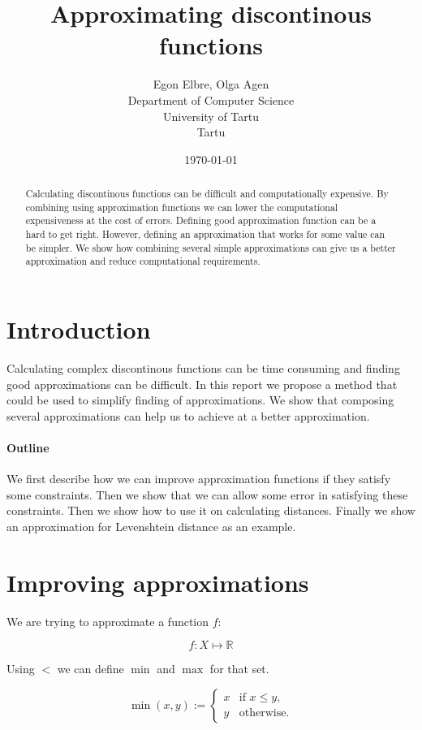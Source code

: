 \documentclass [12pt, a4]{article} %
\title{Approximating discontinous functions}
\author{
    Egon Elbre, Olga Agen \\
        Department of Computer Science \\
    University of Tartu\\
    Tartu\\
}
\date{\today}
\begin{document}
\maketitle

\begin{abstract}
Calculating discontinous functions can be difficult and computationally
expensive. By combining using approximation functions we can lower 
the computational expensiveness at the cost of errors.
Defining good approximation function can be a hard to get right. 
However, defining an approximation that works for some value can 
be simpler. We show how combining several simple approximations 
can give us a better approximation and reduce computational requirements.
\end{abstract}

\section{Introduction}

Calculating complex discontinous functions can be time consuming and finding good approximations can be difficult. In this report we propose a method that could be used to simplify finding of approximations. We show that composing several approximations can help us to achieve at a better approximation.


\paragraph{Outline}

We first describe how we can improve approximation functions if they 
satisfy some constraints. Then we show that we can allow some error
in satisfying these constraints. Then we show how to use it on 
calculating distances. Finally we show an approximation for
Levenshtein distance as an example.

\section{Improving approximations}

\newcommand{\Real}{\mathbb{R}}
\newcommand{\defas}{ := }
\newcommand{\err}[1]{\varepsilon_{#1}}

We are trying to approximate a function $f$:

$$f : X \mapsto \Real$$

Using $<$ we can define $\min$ and $\max$ for that set.

$$ \min(x,y) \defas \begin{cases}
    x & \text{if $x \leq y$}, \\
    y & \text{otherwise}.
\end{cases}
$$
\end{document}
